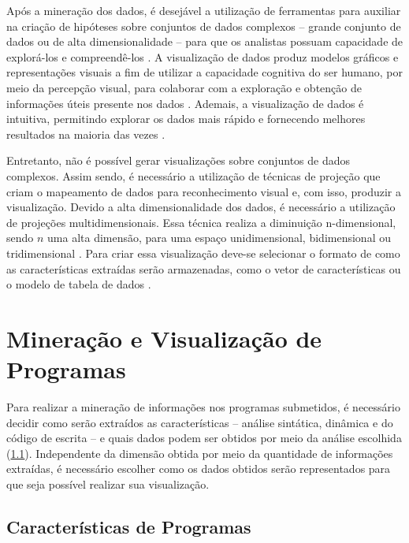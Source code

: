 		Após a mineração dos dados, é desejável a utilização de ferramentas para
		auxiliar na criação de hipóteses sobre conjuntos de dados complexos -- grande
		conjunto de dados ou de alta dimensionalidade -- para que os analistas possuam
		capacidade de explorá-los e compreendê-los \cite{de2003}. A visualização de dados
		produz modelos gráficos e representações visuais a fim de utilizar a capacidade
		cognitiva do ser humano, por meio da percepção visual, para colaborar com
		a exploração e obtenção de informações úteis presente nos dados \cite{de2003,keim2002}.
		Ademais, a visualização de dados é intuitiva, permitindo explorar os dados
		mais rápido e fornecendo melhores resultados na maioria das vezes \cite{keim2002}.
		
		Entretanto, não é possível gerar visualizações sobre conjuntos de dados
		complexos. Assim sendo, é necessário a utilização de técnicas de projeção que
		criam o mapeamento de dados para reconhecimento visual \cite{friedman1974} e,
		com isso, produzir a visualização. Devido a alta dimensionalidade dos dados,
		é necessário a utilização de projeções multidimensionais. Essa técnica realiza
		a diminuição n-dimensional, sendo $n$ uma alta dimensão, para uma espaço
		unidimensional, bidimensional ou tridimensional \cite{paulovich2008least}.
		Para criar essa visualização deve-se selecionar o formato de como as
		características extraídas serão armazenadas, como o vetor de características
		ou o modelo de tabela de dados \cite{de2003}.

	\section{Mineração e Visualização de Programas}
	\label{sec:MinVisual}
		Para realizar a mineração de informações nos programas submetidos, é necessário
		decidir como serão extraídos as características -- análise sintática, dinâmica e
		do código de escrita -- e quais dados podem ser obtidos por meio da análise
		escolhida (\cref{subSec:Caracteristicas}). Independente da dimensão
		obtida por meio da quantidade de informações extraídas, é necessário escolher
		como os dados obtidos serão representados para que seja possível realizar sua visualização.
		
		\subsection{Características de Programas}
		\label{subSec:Caracteristicas}

